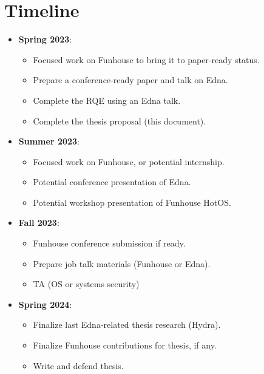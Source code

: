 \section{Timeline}

\begin{itemize}
\item \textbf{Spring 2023}: 
    \begin{itemize}
        \item Focused work on Funhouse to bring it to paper-ready status.
        \item Prepare a conference-ready paper and talk on Edna.
        \item Complete the RQE using an Edna talk.
        \item Complete the thesis proposal (this document).
    \end{itemize}
\item \textbf{Summer 2023}: 
    \begin{itemize}
        \item Focused work on Funhouse, or potential internship.
        \item Potential conference presentation of Edna.
        \item Potential workshop presentation of Funhouse HotOS.
    \end{itemize}
\item \textbf{Fall 2023}: 
    \begin{itemize}
        \item Funhouse conference submission if ready.
        \item Prepare job talk materials (Funhouse or Edna).
        \item TA (OS or systems security)
    \end{itemize}
\item \textbf{Spring 2024}: 
    \begin{itemize}
        \item Finalize last Edna-related thesis research (Hydra).
        \item Finalize Funhouse contributions for thesis, if any.
        \item Write and defend thesis.
    \end{itemize}
\end{itemize}
